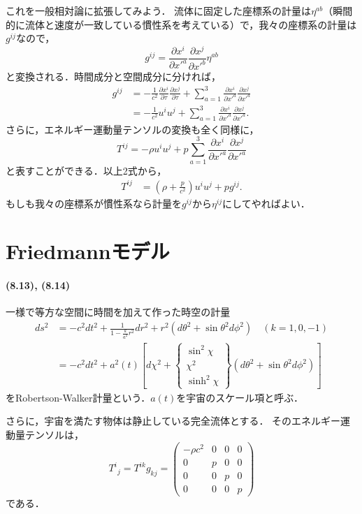 \documentclass[a4paper]{ltjsreport}
\begin{document}
これを一般相対論に拡張してみよう．
流体に固定した座標系の計量は$\eta^{ab}$（瞬間的に流体と速度が一致している慣性系を考えている）で，我々の座標系の計量は$g^{ij}$なので，
\[g^{ij}=\frac{\partial{x^i}}{\partial{x'^a}}\frac{\partial{x^j}}{\partial{x'^b}}\eta^{ab}\]
と変換される．時間成分と空間成分に分ければ，
\begin{align*}
  g^{ij} &=  - \frac{1}{c^2}\frac{\partial{x^i}}{\partial{\tau}}\frac{\partial{x^j}}{\partial{\tau}} + \sum_{a=1}^{3}\frac{\partial{x^i}}{\partial{x'^a}}\frac{\partial{x^j}}{\partial{x'^a}}\\
  &=  - \frac{1}{c^2}u^iu^j + \sum_{a=1}^{3}\frac{\partial{x^i}}{\partial{x'^a}}\frac{\partial{x^j}}{\partial{x'^a}} .
\end{align*}
さらに，エネルギー運動量テンソルの変換も全く同様に，
\[T^{ij}= - \rho{}u^iu^j + p\sum_{a=1}^{3}\frac{\partial{x^i}}{\partial{x'^a}}\frac{\partial{x^j}}{\partial{x'^a}}\]
と表すことができる．以上2式から，
\begin{align}
  T^{ij} &= \left(\rho + \frac{p}{c^2}\right)u^iu^j + pg^{ij} .
\end{align}
もしも我々の座標系が慣性系なら計量を$g^{ij}$から$\eta^{ij}$にしてやればよい．

\section{Friedmannモデル}
\paragraph{(8.13), (8.14)}
一様で等方な空間に時間を加えて作った時空の計量
\begin{align*}
  ds^2 &= -  c^2dt^2 + \frac{1}{1 - \frac{k}{a^2}r^2}dr^2 + r^2(d\theta^2 + \sin\theta^2d\phi^2)\quad(k=1, 0, -  1)\\
  &= -  c^2dt^2 + a^2(t)[d\chi^2 + \left.
  \begin{cases}
    \sin^2\chi\\
    \chi^2\\
    \sinh^2\chi
  \end{cases}
  \right\}(d\theta^2 + \sin\theta^2d\phi^2)]
\end{align*}
をRobertson-Walker計量という．$a(t)$を宇宙のスケール項と呼ぶ．

さらに，宇宙を満たす物体は静止している完全流体とする．
そのエネルギー運動量テンソルは，
\[
{T^i}_j=T^{ik}g_{kj}=
\begin{pmatrix}
  - \rho{c^2} & 0 & 0 & 0\\
  0 & p & 0 & 0\\
  0 & 0 & p & 0\\
  0 & 0 & 0 & p
\end{pmatrix}
\]
である．
\end{document}
